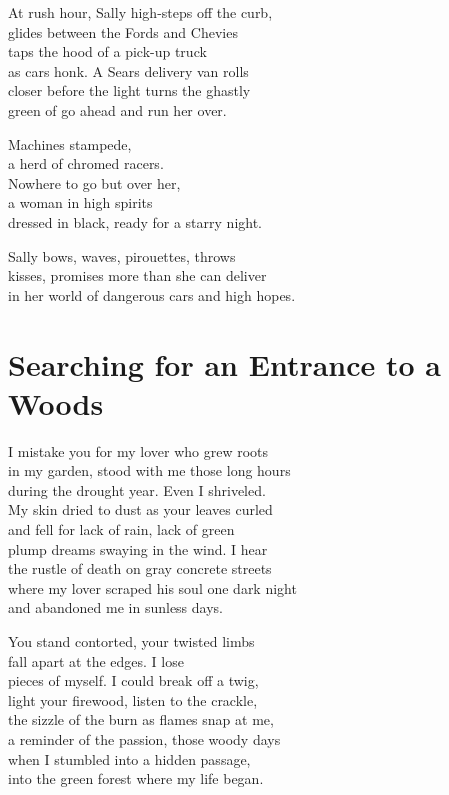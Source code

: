 \documentclass[twoside,10pt]{book}
\begin{document}
At rush hour, Sally high-steps off the curb,\\
glides between the Fords and Chevies\\
taps the hood of a pick-up truck\\
as cars honk. A Sears delivery van rolls\\
closer before the light turns the ghastly\\
green of go ahead and run her over.

Machines stampede,\\
a herd of chromed racers.\\
Nowhere to go but over her,\\
a woman in high spirits\\
dressed in black, ready for a starry night.

Sally bows, waves, pirouettes, throws\\
kisses, promises more than she can deliver\\
in her world of dangerous cars and high hopes.


\clearpage
\section{Searching for an Entrance to a Woods}

I mistake you for my lover who grew roots\\
in my garden, stood with me those long hours\\
during the drought year. Even I shriveled.\\
My skin dried to dust as your leaves curled\\
and fell for lack of rain, lack of green\\
plump dreams swaying in the wind. I hear\\
the rustle of death on gray concrete streets\\
where my lover scraped his soul one dark night\\
and abandoned me in sunless days.

You stand contorted, your twisted limbs\\
fall apart at the edges. I lose\\
pieces of myself. I could break off a twig,\\
light your firewood, listen to the crackle,\\
the sizzle of the burn as flames snap at me,\\
a reminder of the passion, those woody days\\
when I stumbled into a hidden passage,\\
into the green forest where my life began.
\end{document}
